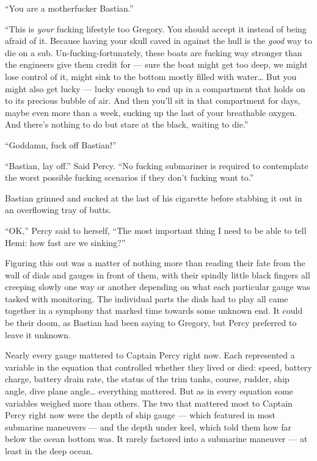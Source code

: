 \documentclass[
]{scrbook}
\begin{document}
``You are a motherfucker Bastian.''

``This is \emph{your} fucking lifestyle too Gregory. You should accept
it instead of being afraid of it. Because having your skull caved in
against the hull is the \emph{good} way to die on a sub.
Un-fucking-fortunately, these boats are fucking way stronger than the
engineers give them credit for --- sure the boat might get too deep, we
might lose control of it, might sink to the bottom mostly filled with
water\ldots{} But you might also get lucky --- lucky enough to end up in
a compartment that holds on to its precious bubble of air. And then
you'll sit in that compartment for days, maybe even more than a week,
sucking up the last of your breathable oxygen. And there's nothing to do
but stare at the black, waiting to die.''

``Goddamn, fuck off Bastian!''

``Bastian, lay off.'' Said Percy. ``No fucking submariner is required to
contemplate the worst possible fucking scenarios if they don't fucking
want to.''

Bastian grinned and sucked at the last of his cigarette before stabbing
it out in an overflowing tray of butts.

``OK,'' Percy said to herself, ``The most important thing I need to be
able to tell Hemi: how fast are we sinking?''

Figuring this out was a matter of nothing more than reading their fate
from the wall of dials and gauges in front of them, with their spindly
little black fingers all creeping slowly one way or another depending on
what each particular gauge was tasked with monitoring. The individual
parts the dials had to play all came together in a symphony that marked
time towards some unknown end. It could be their doom, as Bastian had
been saying to Gregory, but Percy preferred to leave it unknown.

Nearly every gauge mattered to Captain Percy right now. Each represented
a variable in the equation that controlled whether they lived or died:
speed, battery charge, battery drain rate, the status of the trim tanks,
course, rudder, ship angle, dive plane angle\ldots{} everything
mattered. But as in every equation some variables weighed more than
others. The two that mattered most to Captain Percy right now were the
depth of ship gauge --- which featured in most submarine maneuvers ---
and the depth under keel, which told them how far below the ocean bottom
was. It rarely factored into a submarine maneuver --- at least in the
deep ocean.
\end{document}
